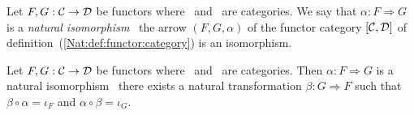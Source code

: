 \begin{defin}\label{Nat:def:isomorphsim}
    Let $F,G:\mbox{$\cal C$}\to\mbox{$\cal D$}$ be functors where \Cat\ and \Dat\ are categories.
    We say that $\alpha:F\Rightarrow G$ is a {\em natural isomorphism} 
    \ifand\ the arrow $(F,G,\alpha)$ of the functor category
    $[\mbox{$\cal C$},\mbox{$\cal D$}]$ of definition~(\ref{Nat:def:functor:category}) 
    is an isomorphism.
\end{defin}

\begin{prop}\label{Nat:prop:isomorphism}
    Let $F,G:\mbox{$\cal C$}\to\mbox{$\cal D$}$ be functors where \Cat\ and \Dat\ are categories.
    Then $\alpha:F\Rightarrow G$ is a natural isomorphism \ifand\ there
    exists a natural transformation $\beta:G\Rightarrow F$ such that
    $\beta\circ\alpha=\iota_{F}$ and $\alpha\circ\beta=\iota_{G}$.
\end{prop}
